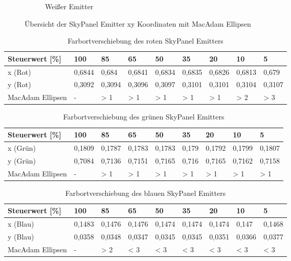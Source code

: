 \documentclass[11pt]{scrartcl}
\begin{document}
\begin{figure}[H]
\begin{subfigure}[b]{.49\textwidth}
        \caption{Weißer Emitter}
    \end{subfigure}
    \caption{Übersicht der SkyPanel Emitter xy Koordinaten mit MacAdam Ellipsen}
\end{figure}
\noindent
\begin{table}[H]
    \begin{tabularx}{\textwidth}{|l|X|X|X|X|X|X|X|X|}
        \hline
        Steuerwert [\%]  & 100    & 85     & 65     & 50     & 35     & 20     & 10     & 5      \\\hline
        x (Rot)          & 0,6844 & 0,684  & 0,6841 & 0,6834 & 0,6835 & 0,6826 & 0,6813 & 0,679  \\\hline
        y (Rot)          & 0,3092 & 0,3094 & 0,3096 & 0,3097 & 0,3101 & 0,3101 & 0,3104 & 0,3107 \\\hline
        MacAdam Ellipsen & -      & > 1    & > 1    & > 1    & > 1    & > 1    & > 2    & > 3    \\\hline
    \end{tabularx}
    \caption{Farbortverschiebung des roten SkyPanel Emitters}
\end{table}
\noindent
\begin{table}[H]
    \begin{tabularx}{\textwidth}{|l|X|X|X|X|X|X|X|X|}
        \hline
        Steuerwert [\%]  & 100    & 85     & 65     & 50     & 35     & 20     & 10     & 5      \\\hline
        x (Grün)         & 0,1809 & 0,1787 & 0,1783 & 0,1783 & 0,179  & 0,1792 & 0,1799 & 0,1807 \\\hline
        y (Grün)         & 0,7084 & 0,7136 & 0,7151 & 0,7165 & 0,716  & 0,7165 & 0,7162 & 0,7158 \\\hline
        MacAdam Ellipsen & -      & > 1    & > 1    & > 1    & > 1    & > 1    & > 1    & > 1    \\\hline
    \end{tabularx}
    \caption{Farbortverschiebung des grünen SkyPanel Emitters}
\end{table}
\noindent
\begin{table}[H]
    \begin{tabularx}{\textwidth}{|l|X|X|X|X|X|X|X|X|}
        \hline
        Steuerwert [\%]  & 100    & 85     & 65     & 50     & 35     & 20     & 10     & 5      \\\hline
        x (Blau)         & 0,1483 & 0,1476 & 0,1476 & 0,1474 & 0,1474 & 0,1474 & 0,147  & 0,1468 \\\hline
        y (Blau)         & 0,0358 & 0,0348 & 0,0347 & 0,0345 & 0,0345 & 0,0351 & 0,0366 & 0,0377 \\\hline
        MacAdam Ellipsen & -      & > 2    & < 3    & < 3    & < 3    & < 3    & < 3    & < 3    \\\hline
    \end{tabularx}
    \caption{Farbortverschiebung des blauen SkyPanel Emitters}
\end{table}
\end{document}
